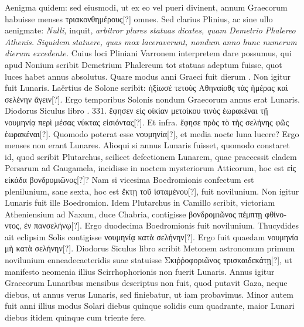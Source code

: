 Aenigma quidem: sed eiusmodi, ut ex eo vel pueri divinent,
 annum
Graecorum habuisse menses \textgreek{τριακονθημέρους[?]} omnes.
Sed clarius Plinius,
ac sine ullo aenigmate: \textit{Nulli,} inquit,
 \textit{arbitror plures statuas dicates,
quam Demetrio Phalereo Athenis.}
\textit{Siquidem}  \textit{statuere,
quas mox laceraverunt, nondum anno hunc numerum dierum excedente.}
Cuius loci Pliniani Varronem interpretem dare possumus,
qui apud Nonium scribit Demetrium Phalereum tot statuas adeptum
fuisse, quot luces habet annus absolutus.
Quare modus anni Graeci
fuit dierum .
Non igitur fuit Lunaris.
Laërtius de Solone
scribit: \textgreek{ἠξίωσέ τετοὺς Αθηναίοθς τὰς ἡμέρας καὶ σελένην ἄγειν[?]}.
Ergo temporibus
Solonis nondum Graecorum annus erat Lunaris.
Diodorus Siculus
libro . 331.
 \textgreek{ἔφησεν εἰς οἰκίαν μετοίκου τινὸς ἑωρακέναι τῇ νουμηνίᾳ
περὶ μέσας νύκτας εἰσιόντας[?]}.
Et infra. \textgreek{ἔφησε πρὸς τὸ τὴς σελήνης φῶς ἑωρακέναι[?]}.
Quomodo poterat esse \textgreek{νουμηνία[?]},
 et media nocte luna lucere?
Ergo menses
non erant Lunares.
%
Alioqui si annus Lunaris fuisset, quomodo constaret
id, quod scribit Plutarchus, scilicet defectionem Lunarem, quae
praecessit cladem Persarum ad Gaugamela, incidisse in noctem mysteriorum
Atticorum, hoc est \textgreek{εἰς εἰκάδα βονδρομιῶνος[?]}?
Nam si vicesima Boedromionis
confectum est plenilunium, sane sexta, hoc est \textgreek{ἕκτῃ τοῦ ἱσταμένου[?]},
fuit novilunium.
Non igitur Lunaris fuit ille Boedromion.
Idem Plutarchus
in Camillo scribit, victoriam Atheniensium ad Naxum, duce
Chabria, contigisse \textgreek{βονδρομιῶνος πέμπτῃ φθίνοντος, ἐν πανσελήνῳ[?]}.
Ergo
duodecima Boedromionis fuit novilunium.
Thucydides ait eclipsim
Solis contigisse \textgreek{νουμηνίᾳ κατὰ σελήνην[?]}.
Ergo fuit quaedam \textgreek{νουμηνία μὴ κατὰ σελήνην[?]}.
Diodorus Siculus libro  scribit Metonem astronomum
primum novilunium enneadecaeteridis suae statuisse \textgreek{Σκιῤῥοφοριῶνος
τρισκαιδεκάτῃ[?]}, ut manifesto neomenia illius Scirrhophorionis non fuerit
Lunaris.
Annus igitur Graecorum Lunaribus mensibus descriptus non
fuit, quod putavit Gaza, neque  diebus,
 ut annus verus Lunaris,
sed  finiebatur, ut iam probavimus.
Minor autem fuit
anni illius modus Solari diebus quinque solidis cum quadrante, maior
Lunari diebus itidem quinque cum triente fere.
